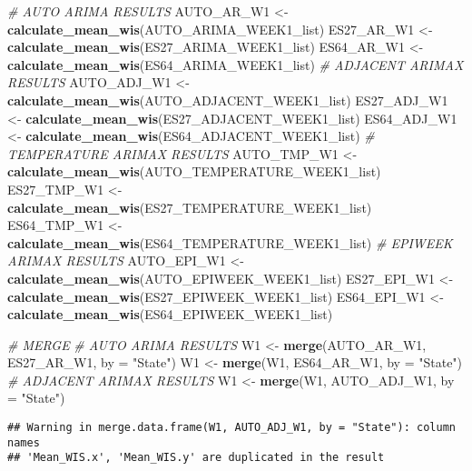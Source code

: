 \documentclass[
]{article}
\newenvironment{Shaded}{\begin{snugshade}}{\end{snugshade}}
\newcommand{\AttributeTok}[1]{\textcolor[rgb]{0.13,0.29,0.53}{#1}}
\newcommand{\CommentTok}[1]{\textcolor[rgb]{0.56,0.35,0.01}{\textit{#1}}}
\newcommand{\FunctionTok}[1]{\textcolor[rgb]{0.13,0.29,0.53}{\textbf{#1}}}
\newcommand{\NormalTok}[1]{#1}
\newcommand{\OtherTok}[1]{\textcolor[rgb]{0.56,0.35,0.01}{#1}}
\newcommand{\StringTok}[1]{\textcolor[rgb]{0.31,0.60,0.02}{#1}}
\begin{document}
\begin{Shaded}
\begin{Highlighting}[]
\CommentTok{\# AUTO ARIMA RESULTS}
\NormalTok{AUTO\_AR\_W1 }\OtherTok{\textless{}{-}} \FunctionTok{calculate\_mean\_wis}\NormalTok{(AUTO\_ARIMA\_WEEK1\_list)}
\NormalTok{ES27\_AR\_W1 }\OtherTok{\textless{}{-}} \FunctionTok{calculate\_mean\_wis}\NormalTok{(ES27\_ARIMA\_WEEK1\_list)}
\NormalTok{ES64\_AR\_W1 }\OtherTok{\textless{}{-}} \FunctionTok{calculate\_mean\_wis}\NormalTok{(ES64\_ARIMA\_WEEK1\_list)}
\CommentTok{\# ADJACENT ARIMAX RESULTS}
\NormalTok{AUTO\_ADJ\_W1 }\OtherTok{\textless{}{-}} \FunctionTok{calculate\_mean\_wis}\NormalTok{(AUTO\_ADJACENT\_WEEK1\_list)}
\NormalTok{ES27\_ADJ\_W1 }\OtherTok{\textless{}{-}} \FunctionTok{calculate\_mean\_wis}\NormalTok{(ES27\_ADJACENT\_WEEK1\_list)}
\NormalTok{ES64\_ADJ\_W1 }\OtherTok{\textless{}{-}} \FunctionTok{calculate\_mean\_wis}\NormalTok{(ES64\_ADJACENT\_WEEK1\_list)}
\CommentTok{\# TEMPERATURE ARIMAX RESULTS}
\NormalTok{AUTO\_TMP\_W1 }\OtherTok{\textless{}{-}} \FunctionTok{calculate\_mean\_wis}\NormalTok{(AUTO\_TEMPERATURE\_WEEK1\_list)}
\NormalTok{ES27\_TMP\_W1 }\OtherTok{\textless{}{-}} \FunctionTok{calculate\_mean\_wis}\NormalTok{(ES27\_TEMPERATURE\_WEEK1\_list)}
\NormalTok{ES64\_TMP\_W1 }\OtherTok{\textless{}{-}} \FunctionTok{calculate\_mean\_wis}\NormalTok{(ES64\_TEMPERATURE\_WEEK1\_list)}
\CommentTok{\# EPIWEEK ARIMAX RESULTS}
\NormalTok{AUTO\_EPI\_W1 }\OtherTok{\textless{}{-}} \FunctionTok{calculate\_mean\_wis}\NormalTok{(AUTO\_EPIWEEK\_WEEK1\_list)}
\NormalTok{ES27\_EPI\_W1 }\OtherTok{\textless{}{-}} \FunctionTok{calculate\_mean\_wis}\NormalTok{(ES27\_EPIWEEK\_WEEK1\_list)}
\NormalTok{ES64\_EPI\_W1 }\OtherTok{\textless{}{-}} \FunctionTok{calculate\_mean\_wis}\NormalTok{(ES64\_EPIWEEK\_WEEK1\_list)}

\CommentTok{\# MERGE}
\CommentTok{\# AUTO ARIMA RESULTS}
\NormalTok{W1 }\OtherTok{\textless{}{-}} \FunctionTok{merge}\NormalTok{(AUTO\_AR\_W1, ES27\_AR\_W1, }\AttributeTok{by =} \StringTok{"State"}\NormalTok{)}
\NormalTok{W1 }\OtherTok{\textless{}{-}} \FunctionTok{merge}\NormalTok{(W1, ES64\_AR\_W1, }\AttributeTok{by =} \StringTok{"State"}\NormalTok{)}
\CommentTok{\# ADJACENT ARIMAX RESULTS}
\NormalTok{W1 }\OtherTok{\textless{}{-}} \FunctionTok{merge}\NormalTok{(W1, AUTO\_ADJ\_W1, }\AttributeTok{by =} \StringTok{"State"}\NormalTok{)}
\end{Highlighting}
\end{Shaded}

\begin{verbatim}
## Warning in merge.data.frame(W1, AUTO_ADJ_W1, by = "State"): column names
## 'Mean_WIS.x', 'Mean_WIS.y' are duplicated in the result
\end{verbatim}
\end{document}
